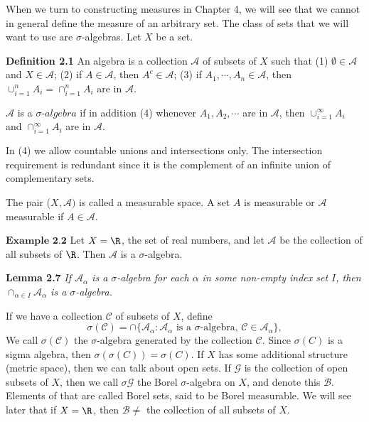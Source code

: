 \begin{sloppypar}
When we turn to constructing measures in Chapter 4, we will see that we cannot in general define the measure of an arbitrary set. The class of sets that we will want to use are $\sigma$-algebras.
\medskip \newline \indent Let $X$ be a set.

\bigskip \textbf{Definition 2.1} An algebra is a collection $\mathcal{A}$ of subsets of $X$ such that
\newline (1) $\emptyset \in  \mathcal{A}$ and $X \in \mathcal{A}$;
\newline (2) if $A \in \mathcal{A}$, then $A^c \in \mathcal{A}$;
\newline (3) if $A_1,\cdots,A_n \in \mathcal{A}$, then $\cup^n_{i=1}A_i = \cap^n_{i=1}A_i$ are in $\mathcal{A}$.

\medskip \noindent $\mathcal{A}$ is a $\sigma$-$algebra$ if in addition
\newline (4) whenever $A_1,A_2,\cdots$ are in $\mathcal{A}$, then $\cup^\infty_{i=1}A_i$ and $\cap^\infty_{i=1}A_i$ are in $\mathcal{A}$.

\bigskip
\noindent In (4) we allow countable unions and intersections only. The intersection requirement is redundant since it is the complement of an infinite union of complementary sets.

\medskip
\noindent The pair ($X,\mathcal{A})$ is called a measurable space. A set $A$ is measurable or $\mathcal{A}$ measurable if $A \in \mathcal{A}$.

\medskip \noindent $\textbf{Example 2.2}$ Let $X = \R$, the set of real numbers, and let $\mathcal{A}$ be the collection of all subsets of $\R$. Then $\mathcal{A}$ is a $\sigma$-algebra.

\medskip \noindent \textbf{Lemma 2.7} \textit{If $\mathcal{A}_\alpha$ is a $\sigma$-algebra for each $\alpha$ in some non-empty index set $I$, then $\cap_{\alpha \in I}\mathcal{A}_\alpha$ is a $\sigma$-algebra.}

If we have a collection $\mathcal{C}$ of subsets of $X$,  define
$$\sigma(\mathcal{C}) = \cap \lbrace \mathcal{A}_\alpha : \mathcal{A}_\alpha \text{ is a } \sigma \text{-algebra, } \mathcal{C} \in \mathcal{A}_\alpha \rbrace ,$$
\newline We call $\sigma(\mathcal{C})$ the $\sigma$-algebra generated by the collection $\mathcal{C}$. Since $\sigma(C)$ is a sigma algebra, then $\sigma(\sigma(C)) = \sigma(C)$.
\newline \indent If $X$ has some additional structure (metric space), then we can talk about open sets. If $\mathcal{G}$ is the collection of open subsets of $X$, then we call $\sigma{\mathcal{G}}$ the Borel $\sigma$-algebra on $X$, and denote this $\mathcal{B}$. Elements of that are called Borel sets, said to be Borel measurable. We will see later that if $X=\R$, then $\mathcal{B} \neq$ the collection of all subsets of $X$.


\end{sloppypar}
